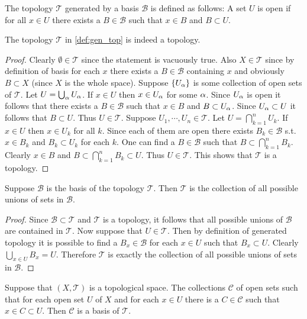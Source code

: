 \begin{definition}\label{def:gen_top}
  The topology $ \mathscr{T}$ generated by a basis $ \mathscr{B}$ is defined as follows: A set $U$ is open if for all $x\in U$ there exists a $B\in \mathscr{B}$ such that $x\in B$ and $B \subset U$.
\end{definition}
\begin{proposition}
  The topology $ \mathscr{T}$ in \cref{def:gen_top} is indeed a topology.
\end{proposition}
\begin{proof}
  Clearly $\emptyset \in \mathscr{T}$ since the statement is vacuously true. Also $X\in \mathscr{T}$ since by definition of basis for each $x$ there exists a $B\in \mathscr{B}$ containing $x$ and obviously $B\subset X$ (since $X$ is the whole space). Suppose $\{U_\alpha\}$ is some collection of open sets of $ \mathscr{T}$. Let $U = \bigcup_\alpha U_\alpha$. If $x\in U$ then $x\in U_\alpha$ for some $\alpha$. Since $U_\alpha$ is open it follows that there exists a $B\in \mathscr{B}$ such that $x\in B$ and $B\subset U_\alpha$. Since $U_\alpha\subset U$ it follows that $B\subset U$. Thus $U\in \mathscr{T}$. Suppose $U_1,\cdots , U_n \in \mathscr{T}$. Let $U = \bigcap_{k=1}^n U_k$. If $x\in U$ then $x\in U_k$ for all $k$. Since each of them are open there exists $B_k \in \mathscr{B}$ s.t. $x\in B_k$ and $B_k \subset U_k$ for each $k$. One can find a $B\in \mathscr{B}$ such that $B\subset \bigcap_{k=1}^n B_k$. Clearly $x \in B$ and $B\subset \bigcap_{k=1}^n B_k \subset U$. Thus $U\in \mathscr{T}$. This shows that $ \mathscr{T}$ is a topology.
\end{proof}
\begin{lemma}
  Suppose $ \mathscr{B}$ is the basis of the topology $ \mathscr{T}$. Then $ \mathscr{T}$ is the collection of all possible unions of sets in $ \mathscr{B}$.
\end{lemma}
\begin{proof}
  Since $ \mathscr{B} \subset \mathscr{T}$ and $ \mathscr{T}$ is a topology, it follows that all possible unions of $ \mathscr{B}$ are contained in $ \mathscr{T}$. Now suppose that $U\in \mathscr{T}$. Then by definition of generated topology it is possible to find a $B_x\in \mathscr{B}$ for each $x\in U$ such that $B_x \subset U$. Clearly $\bigcup_{x\in U} B_x = U$. Therefore $ \mathscr{T}$ is exactly the collection of all possible unions of sets in $ \mathscr{B}$.
\end{proof}
\begin{lemma}
  Suppose that $(X, \mathscr{T})$ is a topological space. The collections $ \mathscr{C}$ of open sets such that for each open set $U$ of $X$ and for each $x\in U$ there is a $C\in \mathscr{C}$ such that $x\in C \subset U$. Then $ \mathscr{C}$ is a basis of $ \mathscr{T}$.
\end{lemma}
